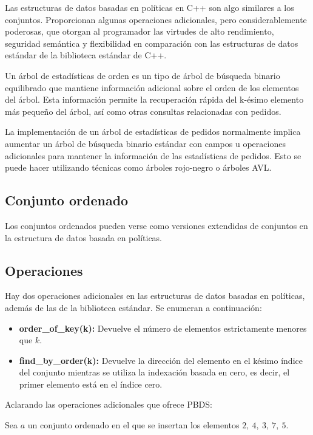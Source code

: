 Las estructuras de datos basadas en políticas en C++ son algo similares a los conjuntos. Proporcionan algunas operaciones adicionales, pero considerablemente poderosas, que otorgan al programador las virtudes de alto rendimiento, seguridad semántica y flexibilidad en comparación con las estructuras de datos estándar de la biblioteca estándar de C++.

Un árbol de estadísticas de orden es un tipo de árbol de búsqueda binario equilibrado que mantiene información adicional sobre el orden de los elementos del árbol. Esta información permite la recuperación rápida del k-ésimo elemento más pequeño del árbol, así como otras consultas relacionadas con pedidos.

La implementación de un árbol de estadísticas de pedidos normalmente implica aumentar un árbol de búsqueda binario estándar con campos u operaciones adicionales para mantener la información de las estadísticas de pedidos. Esto se puede hacer utilizando técnicas como árboles rojo-negro o árboles AVL.


\subsection{Conjunto ordenado}

Los conjuntos ordenados pueden verse como versiones extendidas de conjuntos en la estructura de datos basada en políticas.

\subsection{Operaciones}

Hay dos operaciones adicionales en las estructuras de datos basadas en políticas, además de las de la biblioteca estándar. Se enumeran a continuación:

\begin{itemize}
	\item \textbf{order\_of\_key(k):} Devuelve el número de elementos estrictamente menores que $k$.
	\item \textbf{find\_by\_order(k):} Devuelve la dirección del elemento en el késimo índice del conjunto mientras se utiliza la indexación basada en cero, es decir, el primer elemento está en el índice cero.
\end{itemize}

Aclarando las operaciones adicionales que ofrece PBDS:

Sea $a$ un conjunto ordenado en el que se insertan los elementos $2,~4,~3,~7,~5$.


